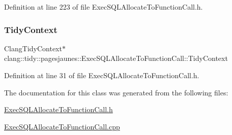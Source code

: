 Definition at line 223 of file Exec\+S\+Q\+L\+Allocate\+To\+Function\+Call.\+h.

\mbox{\label{classclang_1_1tidy_1_1pagesjaunes_1_1_exec_s_q_l_allocate_to_function_call_a3c98610a036c1af3e05dabd693d11c3c}} 
\subsubsection{\texorpdfstring{Tidy\+Context}{TidyContext}}
{\footnotesize\ttfamily Clang\+Tidy\+Context$\ast$ clang\+::tidy\+::pagesjaunes\+::\+Exec\+S\+Q\+L\+Allocate\+To\+Function\+Call\+::\+Tidy\+Context}



Definition at line 31 of file Exec\+S\+Q\+L\+Allocate\+To\+Function\+Call.\+h.



The documentation for this class was generated from the following files\+:\begin{DoxyCompactItemize}
\item 
\hyperlink{_exec_s_q_l_allocate_to_function_call_8h}{Exec\+S\+Q\+L\+Allocate\+To\+Function\+Call.\+h}\item 
\hyperlink{_exec_s_q_l_allocate_to_function_call_8cpp}{Exec\+S\+Q\+L\+Allocate\+To\+Function\+Call.\+cpp}\end{DoxyCompactItemize}
